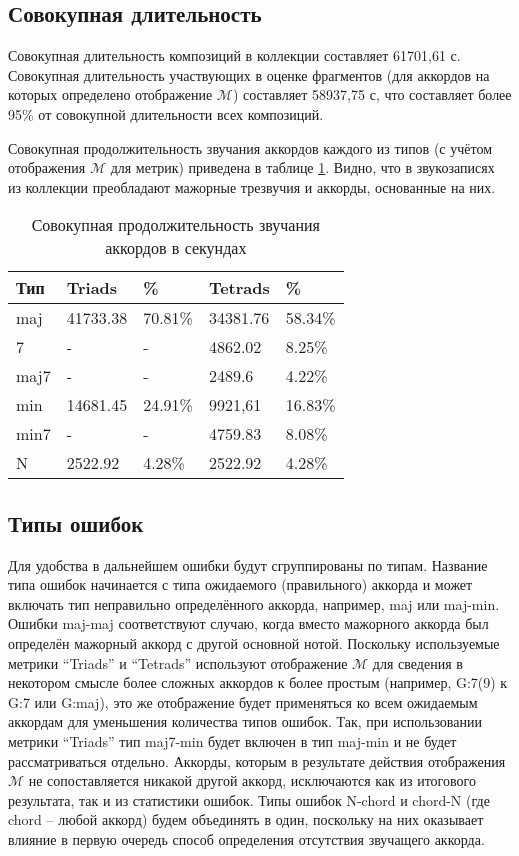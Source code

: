 \subsection{Совокупная длительность}

Совокупная длительность композиций в коллекции составляет 61701,61 с. Совокупная
длительность участвующих в оценке фрагментов (для аккордов на которых определено
отображение $\mathcal{M}$) составляет 58937,75 с, что составляет более 95\% от
совокупной длительности всех композиций.

Совокупная продолжительность звучания аккордов каждого из типов (с учётом
отображения $\mathcal{M}$ для метрик) приведена в таблице \ref{Tchord_stat}.
Видно, что в звукозаписях из коллекции преобладают мажорные трезвучия и аккорды,
основанные на них.

\begin{table} [htbp]
  \centering
  \parbox{15cm}{\caption{Совокупная продолжительность звучания аккордов в
  секундах}
  \label{Tchord_stat}}
  \begin{tabular}{|l||l|l||l|l|}
  \hline
  Тип & Triads & \% & Tetrads & \% \\
  \hline
  maj & 41733.38 & 70.81\% & 34381.76 & 58.34\% \\
  7 & - & - & 4862.02 & 8.25\% \\
  maj7 & - & - & 2489.6 & 4.22\% \\
  \hline
  min & 14681.45 & 24.91\% & 9921,61 & 16.83\% \\
  min7 & - & - & 4759.83 & 8.08\% \\
  \hline
  N & 2522.92 & 4.28\% & 2522.92 & 4.28\% \\
  \hline
  \end{tabular}
\end{table}

\subsection{Типы ошибок}

Для удобства в дальнейшем ошибки будут сгруппированы по типам. Название типа
ошибок начинается с типа ожидаемого (правильного) аккорда и может включать тип
неправильно определённого аккорда, например, maj или maj-min. Ошибки maj-maj
соответствуют случаю, когда вместо мажорного аккорда был определён мажорный
аккорд с другой основной нотой. Поскольку используемые метрики ``Triads'' и
``Tetrads'' используют отображение $\mathcal{M}$ для сведения в некотором
смысле более сложных аккордов к более простым (например, G:7(9) к G:7 или
G:maj), это же отображение будет применяться ко всем ожидаемым аккордам для
уменьшения количества типов ошибок. Так, при использовании метрики ``Triads''
тип maj7-min будет включен в тип maj-min и не будет рассматриваться отдельно.
Аккорды, которым в результате действия отображения $\mathcal{M}$ не
сопоставляется никакой другой аккорд, исключаются как из итогового результата,
так и из статистики ошибок. Типы ошибок N-chord и chord-N (где chord -- любой
аккорд) будем объединять в один, поскольку на них оказывает влияние в первую
очередь способ определения отсутствия звучащего аккорда.

